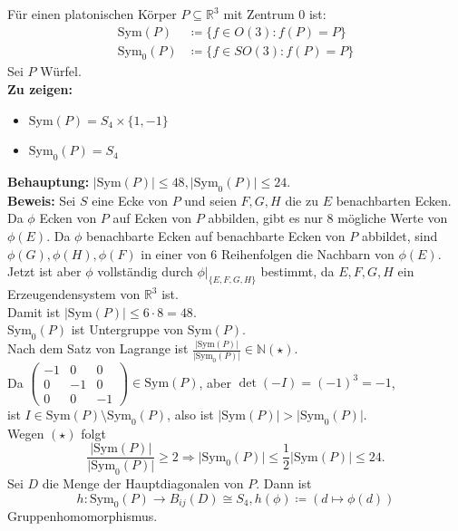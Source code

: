 \begin{problem*}[3]
  
  Für einen platonischen Körper \( P \subseteq \mathbb{R}^3 \) mit Zentrum \( 0 \) ist:
  \begin{align*}
    \text{Sym}(P) &\coloneqq \{ f \in O(3): f(P) = P \} \\
    \text{Sym}_0(P) &\coloneqq \{ f \in SO(3): f(P) = P \}
  \end{align*} 
  Sei \( P \) Würfel. \\
  \textbf{Zu zeigen:} 
  \begin{itemize}
    \item \( \text{Sym}(P) = S_4 \times \{ 1, -1 \} \)
    \item \( \text{Sym}_0(P) = S_4 \)
  \end{itemize}
  \textbf{Behauptung:} 
  \( \vert \text{Sym}(P) \vert \leq 48, \vert \text{Sym}_0(P) \vert \leq 24 \). \\
  \textbf{Beweis:} Sei \( S \) eine Ecke von \( P \) und seien \( F,G,H \) die zu \( E \) benachbarten Ecken. Da \( \phi \) Ecken von \( P \) auf Ecken von \( P \) abbilden, gibt es nur 8 mögliche Werte von \( \phi(E) \). Da \( \phi \) benachbarte Ecken auf benachbarte Ecken von \( P \) abbildet, sind \( \phi(G), \phi(H), \phi(F) \) in einer von 6 Reihenfolgen die Nachbarn von \( \phi(E) \). Jetzt ist aber \( \phi \) vollständig durch \( \phi|_{\{ E,F,G,H \}} \) bestimmt, da \( E,F,G,H \) ein Erzeugendensystem von \( \mathbb{R}^3 \) ist. \\
  Damit ist \( \vert \text{Sym}(P) \vert \leq 6 \cdot 8 = 48 \). \\
  \( \text{Sym}_0(P) \) ist Untergruppe von \( \text{Sym}(P) \). \\
  Nach dem Satz von Lagrange ist \( \frac{\vert \text{Sym}(P) \vert}{\vert \text{Sym}_0(P) \vert} \in \mathbb{N} (\star) \). \\
  Da \( \begin{pmatrix}
    -1 & 0 & 0 \\
    0 & -1 & 0 \\
    0 & 0 & -1 
  \end{pmatrix} \in \text{Sym}(P) \), aber \( \det(-I) = {(-1)}^3 = -1 \),\\
  ist \( I \in \text{Sym}(P) \setminus \text{Sym}_0(P) \), also ist \( \vert \text{Sym}(P) \vert > \vert \text{Sym}_0(P) \vert \). \\
  Wegen \( (\star) \) folgt
  \begin{equation*}
    \frac{\vert \text{Sym}(P) \vert}{\vert \text{Sym}_0(P) \vert} \geq 2 \Rightarrow \vert \text{Sym}_0(P) \vert \leq \frac{1}{2} \vert \text{Sym}(P) \vert \leq 24.
  \end{equation*}
  Sei \( D \) die Menge der Hauptdiagonalen von \( P \). Dann ist 
  \begin{equation*}
    h: \text{Sym}_0(P) \to B_{ij}(D) \cong S_4, h(\phi) \coloneqq (d \mapsto \phi(d))
  \end{equation*}
  Gruppenhomomorphismus. \\


\end{problem*}
